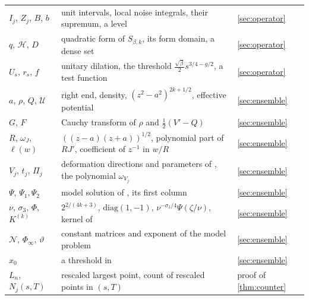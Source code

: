 \documentclass[11pt]{article}
\theoremstyle{remark}
\begin{document}
\begin{appendices}
\begin{tabular}{@{}>{\raggedright\arraybackslash}p{}>{\raggedright\arraybackslash}p{}>{\raggedright\arraybackslash}p{}@{}}
$I_j$, $Z_j$, $B$, $b$ & unit intervals, local noise integrals, their supremum, a level & \cref{sec:operator}\\
$q$, $\mathcal H$, $D$ & quadratic form of $S_{\beta,k}$, its form domain, a dense set & \cref{sec:operator}\\
$U_s$, $r_s$, $f$ & unitary dilation, the threshold $\frac{\sqrt\beta}{2}s^{3/4-g/2}$, a test function & \cref{sec:operator}\\
$a$, $\rho$, $Q$, $\mathcal U$ & right end, density, $(z^2-a^2)^{2k+1/2}$, effective potential & \cref{sec:ensemble}\\
$G$, $F$ & Cauchy transform of $\rho$ and $\frac12(V'-Q)$ & \cref{sec:ensemble}\\
$R$, $\omega_J$, $\ell(w)$ & $((z-a)(z+a))^{1/2}$, polynomial part of $RJ'$, coefficient of $z^{-1}$ in $w/R$ & \cref{sec:ensemble}\\
$V_j$, $t_j$, $\Pi_j$ & deformation directions and parameters of \cite{DDL}, the polynomial $\omega_{V_j}$ & \cref{sec:ensemble}\\
$\Psi$, $\Psi_1,\Psi_2$ & model solution of \cite[Section~1.4]{DDL}, its first column & \cref{sec:ensemble}\\
$\nu$, $\sigma_3$, $\Phi$, $K^{(k)}$ & $2^{2/(4k+3)}$, $\mathrm{diag}(1,-1)$, $\nu^{-\sigma_3/4}\Psi(\zeta/\nu)$, kernel of \cite[(1.14)]{CIK} & \cref{sec:ensemble}\\
$\mathcal N$, $\Phi_\infty$, $\vartheta$ & constant matrices and exponent of the model problem & \cref{sec:ensemble}\\
$x_0$ & a threshold in \cite[(1.23)]{CIK} & \cref{sec:ensemble}\\
$L_n$, $N_j(s,T)$ & rescaled largest point, count of rescaled points in $(s,T)$ & proof of \cref{thm:counter}
\end{tabular}
\end{appendices}
\end{document}
